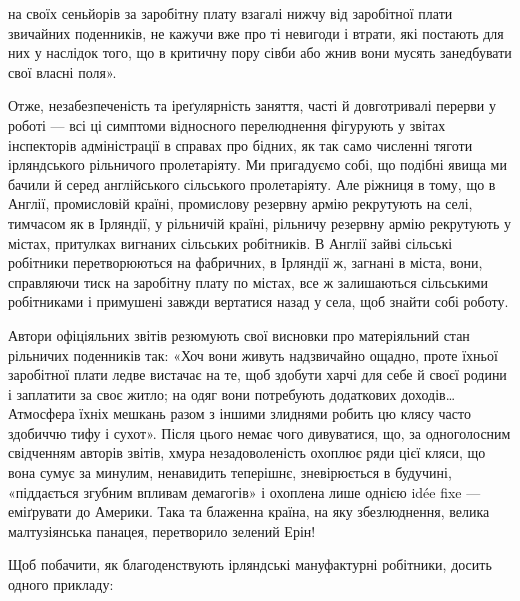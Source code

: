 \parcont{}  %
на своїх сеньйорів за заробітну плату взагалі нижчу від заробітної
плати звичайних поденників, не кажучи вже про ті невигоди
і втрати, які постають для них у наслідок того, що в критичну
пору сівби або жнив вони мусять занедбувати свої власні поля».

Отже, незабезпеченість та іреґулярність заняття, часті й довготривалі
перерви у роботі — всі ці симптоми відносного перелюднення
фігурують у звітах інспекторів адміністрації в справах
про бідних, як так само численні тяготи ірляндського рільничого
пролетаріяту. Ми пригадуємо собі, що подібні явища ми бачили
й серед англійського сільського пролетаріяту. Але ріжниця
в тому, що в Англії, промисловій країні, промислову резервну
армію рекрутують на селі, тимчасом як в Ірляндії, у рільничій
країні, рільничу резервну армію рекрутують у містах, притулках
вигнаних сільських робітників. В Англії зайві сільські робітники
перетворюються на фабричних, в Ірляндії ж, загнані в міста,
вони, справляючи тиск на заробітну плату по містах, все ж залишаються
сільськими робітниками і примушені завжди вертатися
назад у села, щоб знайти собі роботу.

Автори офіціяльних звітів резюмують свої висновки про
матеріяльний стан рільничих поденників так: «Хоч вони живуть
надзвичайно ощадно, проте їхньої заробітної плати ледве вистачає
на те, щоб здобути харчі для себе й своєї родини і заплатити
за своє житло; на одяг вони потребують додаткових доходів\dots{}
Атмосфера їхніх мешкань разом з іншими злиднями робить цю
клясу часто здобиччю тифу і сухот». Після цього немає чого
дивуватися, що, за одноголосним свідченням авторів звітів,
хмура незадоволеність охоплює ряди цієї кляси, що вона сумує
за минулим, ненавидить теперішнє, зневірюється в будучині,
«піддається згубним впливам демагогів» і охоплена лише однією
idée fixe — еміґрувати до Америки. Така та блаженна країна,
на яку збезлюднення, велика малтузіянська панацея, перетворило
зелений Ерін!

Щоб побачити, як благоденствують ірляндські мануфактурні
робітники, досить одного прикладу:

